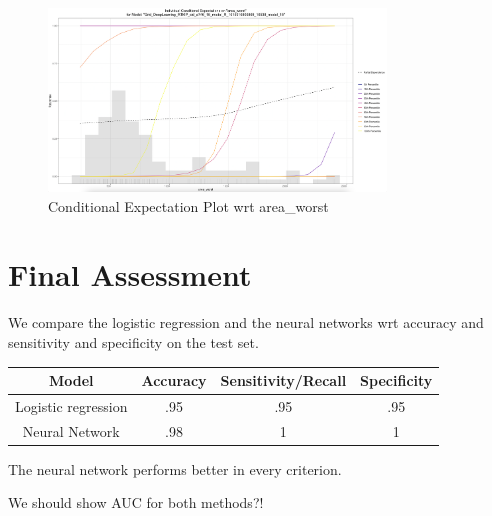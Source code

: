 \documentclass[]{article}
\begin{document}
\begin{figure}
    \centering
    \includegraphics[width=0.8\textwidth]{images/ice_plot.png}
    \caption{Conditional Expectation Plot wrt area\_worst}
    \label{fig:ice_plot}
\end{figure}

\section{Final Assessment}\label{final-assessment}

We compare the logistic regression and the neural networks wrt accuracy
and sensitivity and specificity on the test set.

\begin{center}
 \begin{tabular}{|c | c |  c | c|} 
 \hline
 Model & Accuracy & Sensitivity/Recall & Specificity \\ [0.5ex] 
 \hline
 Logistic regression & .95 & .95 & .95 \\ 
 \hline
 Neural Network & .98 & 1 & 1 \\
 \hline
\end{tabular}
\end{center}

The neural network performs better in every criterion.

We should show AUC for both methods?!
\end{document}
